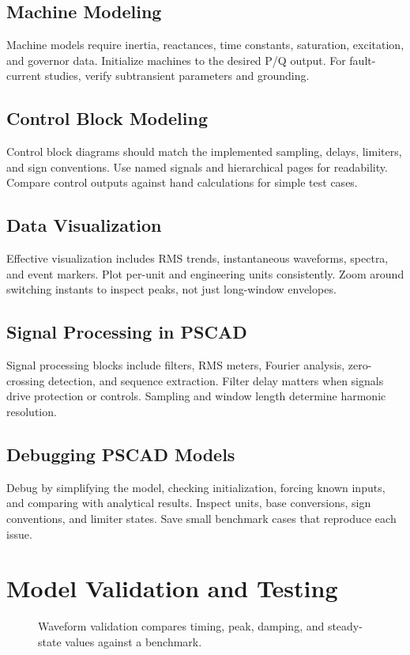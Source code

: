 \documentclass[11pt]{article}
\begin{document}
\subsection{Machine Modeling}
Machine models require inertia, reactances, time constants, saturation, excitation, and governor data. Initialize machines to the desired P/Q output. For fault-current studies, verify subtransient parameters and grounding.

\subsection{Control Block Modeling}
Control block diagrams should match the implemented sampling, delays, limiters, and sign conventions. Use named signals and hierarchical pages for readability. Compare control outputs against hand calculations for simple test cases.

\subsection{Data Visualization}
Effective visualization includes RMS trends, instantaneous waveforms, spectra, and event markers. Plot per-unit and engineering units consistently. Zoom around switching instants to inspect peaks, not just long-window envelopes.

\subsection{Signal Processing in PSCAD}
Signal processing blocks include filters, RMS meters, Fourier analysis, zero-crossing detection, and sequence extraction. Filter delay matters when signals drive protection or controls. Sampling and window length determine harmonic resolution.

\subsection{Debugging PSCAD Models}
Debug by simplifying the model, checking initialization, forcing known inputs, and comparing with analytical results. Inspect units, base conversions, sign conventions, and limiter states. Save small benchmark cases that reproduce each issue.

\section{Model Validation and Testing}
\begin{figure}[h]
\centering

\caption{Waveform validation compares timing, peak, damping, and steady-state values against a benchmark.}
\end{figure}
\end{document}
